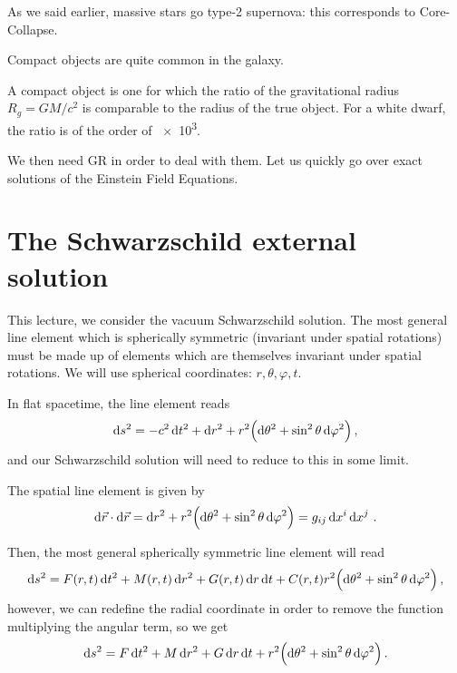 \documentclass[main.tex]{subfiles}
\begin{document}

As we said earlier, massive stars go type-2 supernova: this corresponds to Core-Collapse. 

Compact objects are quite common in the galaxy. 


A compact object is one for which the ratio of the gravitational radius \(R_g = GM / c^2\) is comparable to the radius of the true object.
For a white dwarf, the ratio is of the order of \num{e3}.

We then need GR in order to deal with them. 
Let us quickly go over exact solutions of the Einstein Field Equations.

\section{The Schwarzschild external solution}

This lecture, we consider the vacuum Schwarzschild solution.
The most general line element which is spherically symmetric (invariant under spatial rotations) 
must be made up of elements which are themselves invariant under spatial rotations. 
We will use spherical coordinates: \(r, \theta , \varphi , t\). 

In flat spacetime, the line element reads 
%
\begin{align}
\dd{s^2} = - c^2 \dd{t^2} + \dd{r^2} + r^2 \qty( \dd{\theta^2} + \sin^2 \theta \dd{\varphi^2})
\,,
\end{align}
%
and our Schwarzschild solution will need to reduce to this in some limit.

The spatial line element is given by 
%
\begin{align}
\dd{\vec{r}} \cdot \dd{\vec{r}} =  \dd{r^2} + r^2 \qty( \dd{\theta^2} + \sin^2 \theta \dd{\varphi^2}) = g_{ij} \dd{x^{i}} \dd{x^{j}}
\,.
\end{align}

Then, the most general spherically symmetric line element will read 
%
\begin{align}
\dd{s^2} =  F(r ,t) \dd{t^2} + M(r, t) \dd{r^2} + G(r, t) \dd{r} \dd{t} + C(r, t) r^2 \qty( \dd{\theta^2} + \sin^2 \theta \dd{\varphi^2})
\,,
\end{align}
%
however, we can redefine the radial coordinate in order to remove the function multiplying the angular term, so we get 
%
\begin{align}
\dd{s^2} = F \dd{t^2} + M \dd{r^2}  + G \dd{r} \dd{t} 
+ r^2 \qty(\dd{\theta^2} + \sin^2\theta \dd{\varphi^2}) 
\,.
\end{align}
\end{document}
